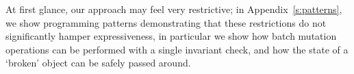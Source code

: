 At first glance, our approach may feel very restrictive; in Appendix~\ref{s:patterns}, we show
programming patterns demonstrating that these restrictions do not significantly hamper expressiveness, in particular we show how batch mutation operations can be performed with a single invariant check, and how the state of a `broken' object can be safely passed around.


